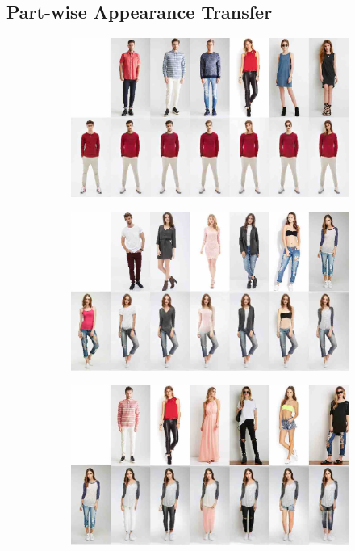 	\subsection{Part-wise Appearance Transfer}\label{sec:partappearance}
	\begin{figure}[htp]
		\begin{subfigure}{0.49\linewidth}
		\centering
		\includegraphics[trim={0cm 0cm 0cm 0cm},clip, width=1.\linewidth]{fig/factor/part6_01}\caption{}
		\label{fig:part3_00}
		\end{subfigure}
		\begin{subfigure}{0.49\linewidth}
		\centering
		\includegraphics[trim={0cm 0cm 0cm 0cm},clip, width=1.\linewidth]{fig/factor/part6_10}\caption{}
		\label{fig:part3_11}
		\end{subfigure}
		\begin{subfigure}{0.49\linewidth}
		\centering
		\includegraphics[trim={0cm 0cm 0cm 0cm},clip, width=1.\linewidth]{fig/factor/part6_21}\caption{}

\end{subfigure}
\end{figure}
